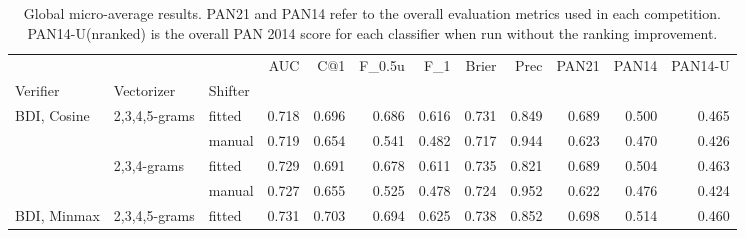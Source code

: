\documentclass[
    hf
]{ceurart}
\begin{document}
\begin{table}
    \caption{Global micro-average results. PAN21 and PAN14 refer to the overall evaluation metrics
    used in each competition. PAN14-U(nranked) is the overall PAN 2014 score for each classifier
    when run without the ranking improvement.}
    \label{tab:micro}
    \begin{adjustbox}{max width=\textwidth}
        \begin{tabular}{lllrrrrrrrrr}
            \toprule
                                                      &                                     &         & AUC            & C@1            & F_{0.5u}        & F_1            & Brier          & Prec           & PAN21          & PAN14          & PAN14-U        \\
            Verifier                                  & Vectorizer                          & Shifter &                &                &                &                &                &                &                &                &                \\
            \midrule
            \multirow[c]{4}{*}{BDI, Cosine }          & \multirow[c]{2}{*}{ 2,3,4,5-grams } & fitted  & 0.718          & 0.696          & 0.686          & 0.616          & 0.731          & 0.849          & 0.689          & 0.500          & 0.465          \\
                                                      &                                     & manual  & 0.719          & 0.654          & 0.541          & 0.482          & 0.717          & 0.944          & 0.623          & 0.470          & 0.426          \\
                                                      & \multirow[c]{2}{*}{ 2,3,4-grams }   & fitted  & 0.729          & 0.691          & 0.678          & 0.611          & 0.735          & 0.821          & 0.689          & 0.504          & 0.463          \\
                                                      &                                     & manual  & 0.727          & 0.655          & 0.525          & 0.478          & 0.724          & 0.952          & 0.622          & 0.476          & 0.424          \\
            \multirow[c]{4}{*}{BDI, Minmax }          & \multirow[c]{2}{*}{ 2,3,4,5-grams } & fitted  & 0.731          & 0.703          & 0.694          & 0.625          & 0.738          & 0.852          & 0.698          & 0.514          & 0.460          \\

\end{tabular}
\end{adjustbox}
\end{table}
\end{document}
